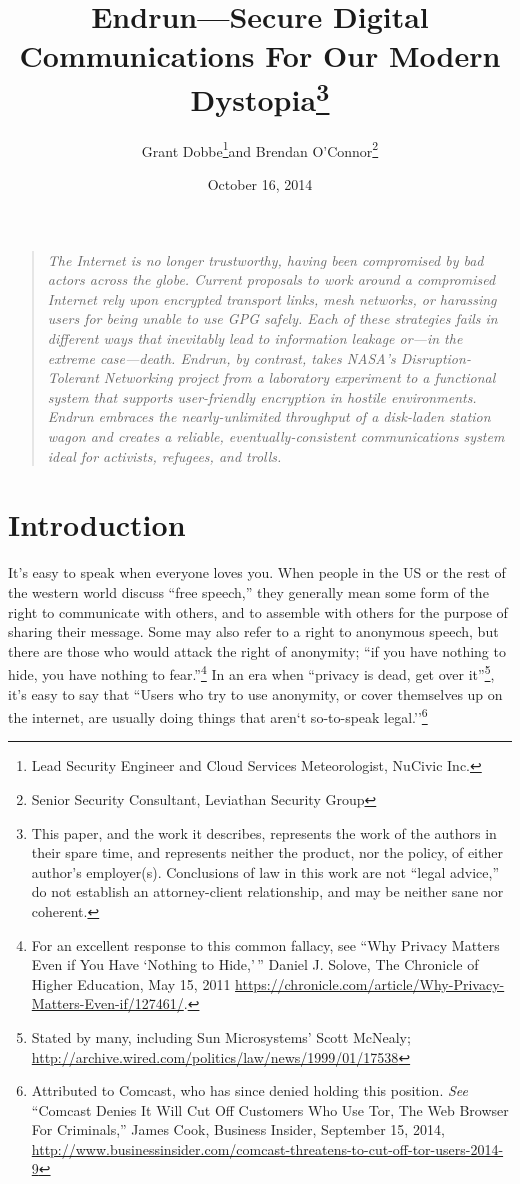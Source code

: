 \documentclass[12pt]{article}
\title{Endrun---Secure Digital Communications For Our Modern Dystopia\footnote{This paper, and the work it describes, represents the work of the authors in their spare time, and represents neither the product, nor the policy, of either author's employer(s). Conclusions of law in this work are not ``legal advice,'' do not establish an attorney-client relationship, and may be neither sane nor coherent.}}
\author{Grant Dobbe\footnote{Lead Security Engineer and Cloud Services Meteorologist, NuCivic Inc.}\space\space and Brendan O'Connor\footnote{Senior Security Consultant, Leviathan Security Group}}
\date{October 16, 2014}
\begin{document}
	
	\maketitle
  
  \begin{quote}
    \emph{The Internet is no longer trustworthy, having been compromised by bad actors across the globe. Current proposals to work around a compromised Internet rely upon encrypted transport links, mesh networks, or harassing users for being unable to use GPG safely. Each of these strategies fails in different ways that inevitably lead to information leakage or---in the extreme case---death. Endrun, by contrast, takes NASA's Disruption-Tolerant Networking project from a laboratory experiment to a functional system that supports user-friendly encryption in hostile environments. Endrun embraces the nearly-unlimited throughput of a disk-laden station wagon and creates a reliable, eventually-consistent communications system ideal for activists, refugees, and trolls.}
    \end{quote}
	
	\section{Introduction}
	
  It's easy to speak when everyone loves you. When people in the US or the rest of the western world discuss ``free speech,'' they generally mean some form of the right to communicate with others, and to assemble with others for the purpose of sharing their message. Some may also refer to a right to anonymous speech, but there are those who would attack the right of anonymity; ``if you have nothing to hide, you have nothing to fear.''\footnote{For an excellent response to this common fallacy, see ``Why Privacy Matters Even if You Have `Nothing to Hide,'\,'' Daniel J. Solove, The Chronicle of Higher Education, May 15, 2011 \url{https://chronicle.com/article/Why-Privacy-Matters-Even-if/127461/}.} In an era when ``privacy is dead, get over it''\footnote{Stated by many, including Sun Microsystems' Scott McNealy; \url{http://archive.wired.com/politics/law/news/1999/01/17538}}, it's easy to say that ``Users who try to use anonymity, or cover themselves up on the internet, are usually doing things that aren`t so-to-speak legal.''\footnote{Attributed to Comcast, who has since denied holding this position. \emph{See} ``Comcast Denies It Will Cut Off Customers Who Use Tor, The Web Browser For Criminals,'' James Cook, Business Insider, September 15, 2014, \url{http://www.businessinsider.com/comcast-threatens-to-cut-off-tor-users-2014-9}}
  
\end{document}
